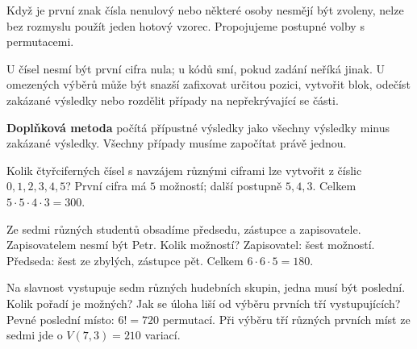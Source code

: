 \documentclass[11pt,a4paper]{article}
\begin{document}

Když je první znak čísla nenulový nebo některé osoby nesmějí být zvoleny, nelze bez rozmyslu použít jeden hotový vzorec. Propojujeme postupné volby s permutacemi.



U čísel nesmí být první cifra nula; u kódů smí, pokud zadání neříká jinak. U omezených výběrů může být snazší zafixovat určitou pozici, vytvořit blok, odečíst zakázané výsledky nebo rozdělit případy na nepřekrývající se části.
\begin{definiceBox}
\textbf{Doplňková metoda} počítá přípustné výsledky jako všechny výsledky minus zakázané výsledky. Všechny případy musíme započítat právě jednou.
\end{definiceBox}


\begin{prikladReseniBox}[title={Příklad 1}]
Kolik čtyřciferných čísel s navzájem různými ciframi lze vytvořit z číslic $0,1,2,3,4,5$?
\tcblower
První cifra má $5$ možností; další postupně $5,4,3$. Celkem $5\cdot5\cdot4\cdot3=300$.
\end{prikladReseniBox}



\begin{prikladReseniBox}[title={Příklad 2}]
Ze sedmi různých studentů obsadíme předsedu, zástupce a zapisovatele. Zapisovatelem nesmí být Petr. Kolik možností?
\tcblower
Zapisovatel: šest možností. Předseda: šest ze zbylých, zástupce pět. Celkem $6\cdot6\cdot5=180$.
\end{prikladReseniBox}



\begin{prikladReseniBox}[title={Příklad 3}]
Na slavnost vystupuje sedm různých hudebních skupin, jedna musí být poslední. Kolik pořadí je možných? Jak se úloha liší od výběru prvních tří vystupujících?
\tcblower
Pevné poslední místo: $6!=720$ permutací. Při výběru tří různých prvních míst ze sedmi jde o $V(7,3)=210$ variací.
\end{prikladReseniBox}



\end{document}
